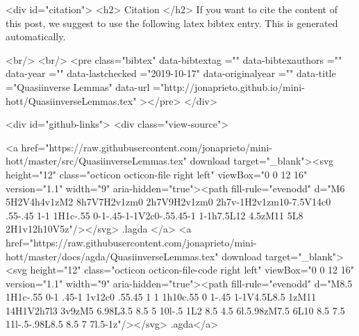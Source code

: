   
  <div id="citation">
  <h2> Citation </h2>
  If you want to cite the content of this post,
  we suggest to use the following latex bibtex entry.
  This is generated automatically.

  <br/>
  <br/>
  <pre class="bibtex"
       data-bibtextag =""
       data-bibtexauthors =""
       data-year =""
       data-lastchecked ="2019-10-17"
       data-originalyear =""
       data-title ="Quasiinverse Lemmas"
       data-url ="http://jonaprieto.github.io/mini-hott/QuasiinverseLemmas.tex"
  ></pre>
  </div>
  

  <div id="github-links">
    <div class="view-source">
      
        <a href="https://raw.githubusercontent.com/jonaprieto/mini-hott/master/src/QuasiinverseLemmas.tex" download target="_blank"><svg height="12" class="octicon octicon-file right left" viewBox="0 0 12 16" version="1.1" width="9" aria-hidden="true"><path fill-rule="evenodd" d="M6 5H2V4h4v1zM2 8h7V7H2v1zm0 2h7V9H2v1zm0 2h7v-1H2v1zm10-7.5V14c0 .55-.45 1-1 1H1c-.55 0-1-.45-1-1V2c0-.55.45-1 1-1h7.5L12 4.5zM11 5L8 2H1v12h10V5z"/></svg> .lagda </a>
        <a href="https://raw.githubusercontent.com/jonaprieto/mini-hott/master/docs/agda/QuasiinverseLemmas.tex" download target="_blank"><svg height="12" class="octicon octicon-file-code right left" viewBox="0 0 12 16" version="1.1" width="9" aria-hidden="true"><path fill-rule="evenodd" d="M8.5 1H1c-.55 0-1 .45-1 1v12c0 .55.45 1 1 1h10c.55 0 1-.45 1-1V4.5L8.5 1zM11 14H1V2h7l3 3v9zM5 6.98L3.5 8.5 5 10l-.5 1L2 8.5 4.5 6l.5.98zM7.5 6L10 8.5 7.5 11l-.5-.98L8.5 8.5 7 7l.5-1z"/></svg> .agda</a>
      
